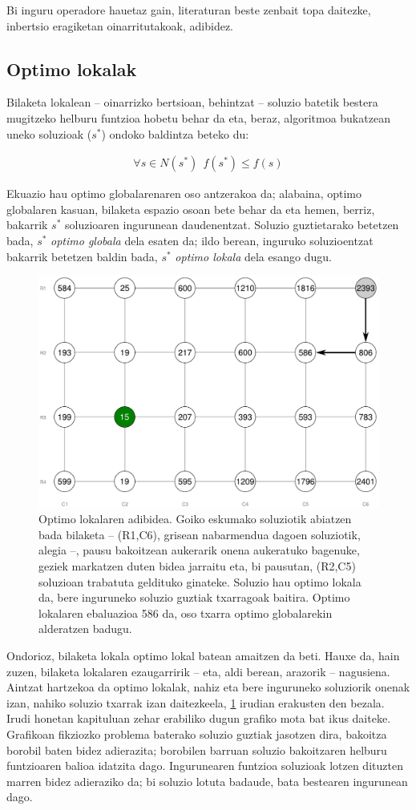 \documentclass[eu]{ifirak}\usepackage[]{graphicx}\usepackage[]{color}
\begin{document}
Bi inguru operadore hauetaz gain, literaturan beste zenbait topa daitezke, inbertsio eragiketan oinarritutakoak, adibidez.


\subsection{Optimo lokalak}

Bilaketa lokalean -- oinarrizko bertsioan, behintzat -- soluzio batetik bestera mugitzeko helburu funtzioa hobetu behar da eta, beraz, algoritmoa bukatzean uneko soluzioak ($s^*$) ondoko baldintza beteko du:

\begin{align*}
\forall s \in N(s^*)\ \ f(s^*)\leq f(s)
\end{align*}

Ekuazio hau optimo globalarenaren oso antzerakoa da; alabaina, optimo globalaren kasuan, bilaketa espazio osoan bete behar da eta hemen, berriz, bakarrik $s^*$ soluzioaren ingurunean daudenentzat. Soluzio guztietarako betetzen bada, $s^*$ \textit{optimo globala} dela esaten da; ildo berean, inguruko soluzioentzat bakarrik betetzen baldin bada, $s^*$ \textit{optimo lokala} dela esango dugu.

\begin{figure}[t]
\centering
\includegraphics[width=0.66\linewidth]{./Irudiak/local_optimum}
\caption{Optimo lokalaren adibidea. Goiko eskumako soluziotik abiatzen bada bilaketa -- (R1,C6), grisean nabarmendua dagoen soluziotik, alegia --, pausu bakoitzean aukerarik onena aukeratuko bagenuke, geziek markatzen duten bidea jarraitu eta, bi pausutan, (R2,C5) soluzioan trabatuta geldituko ginateke. Soluzio hau optimo lokala da, bere inguruneko soluzio guztiak txarragoak baitira. Optimo lokalaren ebaluazioa 586 da, oso txarra optimo globalarekin alderatzen badugu.}
\label{fig:local_optimum}
\end{figure}

Ondorioz, bilaketa lokala optimo lokal batean amaitzen da beti. Hauxe da, hain zuzen, bilaketa lokalaren ezaugarririk -- eta, aldi berean, arazorik -- nagusiena. Aintzat hartzekoa da optimo lokalak, nahiz eta bere inguruneko soluziorik onenak izan, nahiko soluzio txarrak izan daitezkeela, \ref{fig:local_optimum} irudian erakusten den bezala. Irudi honetan kapituluan zehar erabiliko dugun grafiko mota bat ikus daiteke. Grafikoan fikziozko problema baterako soluzio guztiak jasotzen dira, bakoitza borobil baten bidez adierazita; borobilen barruan soluzio bakoitzaren helburu funtzioaren balioa idatzita dago. Ingurunearen funtzioa soluzioak lotzen dituzten marren bidez adieraziko da; bi soluzio lotuta badaude, bata bestearen ingurunean dago. 
\end{document}
